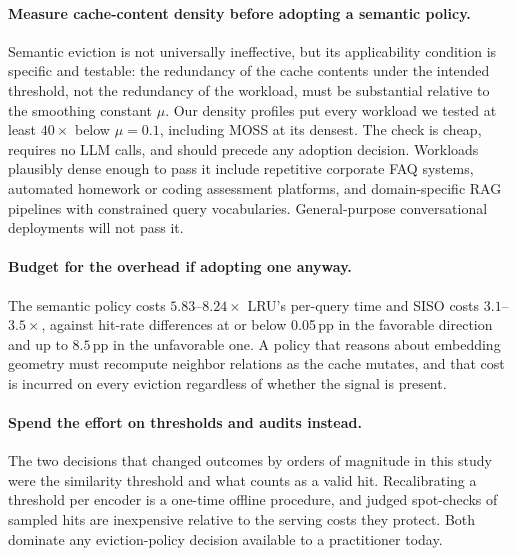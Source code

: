 \documentclass[sigconf,nonacm]{acmart}
\begin{document}
\paragraph{Measure cache-content density before adopting a semantic policy.} Semantic eviction is not universally ineffective, but its applicability condition is specific and testable: the redundancy of the cache contents under the intended threshold, not the redundancy of the workload, must be substantial relative to the smoothing constant $\mu$. Our density profiles put every workload we tested at least $40\times$ below $\mu = 0.1$, including MOSS at its densest. The check is cheap, requires no LLM calls, and should precede any adoption decision. Workloads plausibly dense enough to pass it include repetitive corporate FAQ systems, automated homework or coding assessment platforms, and domain-specific RAG pipelines with constrained query vocabularies. General-purpose conversational deployments will not pass it.

\paragraph{Budget for the overhead if adopting one anyway.} The semantic policy costs $5.83$--$8.24\times$ LRU's per-query time and SISO costs $3.1$--$3.5\times$, against hit-rate differences at or below 0.05\,pp in the favorable direction and up to $8.5$\,pp in the unfavorable one. A policy that reasons about embedding geometry must recompute neighbor relations as the cache mutates, and that cost is incurred on every eviction regardless of whether the signal is present.

\paragraph{Spend the effort on thresholds and audits instead.} The two decisions that changed outcomes by orders of magnitude in this study were the similarity threshold and what counts as a valid hit. Recalibrating a threshold per encoder is a one-time offline procedure, and judged spot-checks of sampled hits are inexpensive relative to the serving costs they protect. Both dominate any eviction-policy decision available to a practitioner today.
\end{document}
